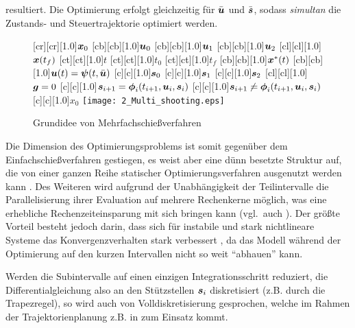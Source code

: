 resultiert.
Die Optimierung erfolgt gleichzeitig für $\bar{\boldsymbol{u}}$ und $\bar{\boldsymbol{s}}$, sodass \emph{simultan} die Zustands- und Steuertrajektorie optimiert werden.
%
\begin{figure}[h]
\centering
	[cr][cr][1.0]{$\boldsymbol{x}_0$}
	[cb][cb][1.0]{$\boldsymbol{u}_0$}
	[cb][cb][1.0]{$\boldsymbol{u}_1$}
	[cb][cb][1.0]{$\boldsymbol{u}_2$}
	[cl][cl][1.0]{$\boldsymbol{x}(t_f)$}
	[ct][ct][1.0]{$t$}
	[ct][ct][1.0]{$t_0$}
	[ct][ct][1.0]{$t_f$}
	[cb][cb][1.0]{$\boldsymbol{x}^\ast(t)$}
	[cb][cb][1.0]{$\boldsymbol{u}(t) = \boldsymbol{\psi}(t,\bar{\boldsymbol{u}})$}
	[c][1.0]{$\boldsymbol{s}_0$}
	[c][1.0]{$\boldsymbol{s}_1$}
	[c][1.0]{$\boldsymbol{s}_2$}
	[cl][cl][1.0]{$\boldsymbol{g}=0$}
	[c][1.0]{$\boldsymbol{s}_{i+1}=\boldsymbol{\phi}_i(t_{i+1},\boldsymbol{u}_i,\boldsymbol{s}_i)$}
	[c][1.0]{$\bs{s}_{i+1} \neq \bs{\phi}_i(t_{i+1},\bs{u}_i,\bs{s}_i)$}
	[c][1.0]{$x_0$}
 \texttt{[image: 2\_Multi\_shooting.eps]}
	\caption[Grundidee von Mehrfachschießverfahren]{Grundidee von Mehrfachschießverfahren \cite{diehl_fast_multipleshooting}}
	\label{fig:parametrisierte_nmpc_multi}
\end{figure}
%
Die Dimension des Optimierungsproblems ist somit gegenüber dem Einfachschießverfahren gestiegen, es weist aber eine dünn besetzte Struktur auf, die von einer ganzen Reihe statischer Optimierungsverfahren ausgenutzt werden kann \cite{diehl_fast_multipleshooting}. Des Weiteren wird aufgrund der Unabhängigkeit der Teilintervalle die Parallelisierung ihrer Evaluation auf mehrere Rechenkerne möglich, was eine erhebliche Rechenzeiteinsparung mit sich bringen kann (vgl.\ auch \cite{behrendt2011paralleles}). Der größte Vorteil besteht jedoch darin, dass sich für instabile und stark nichtlineare Systeme das Konvergenzverhalten stark verbessert \cite{diehl_numerical_methods}, da das Modell während der Optimierung auf den kurzen Intervallen nicht so weit "`abhauen"' kann.

Werden die Subintervalle auf einen einzigen Integrationsschritt reduziert, die Differentialgleichung also an den Stützstellen $\boldsymbol{s}_i$ diskretisiert (z.B. durch die Trapezregel), so wird auch von Volldiskretisierung gesprochen, welche im Rahmen der Trajektorienplanung z.B. in \cite{gerdts2009generating} zum Einsatz kommt.


